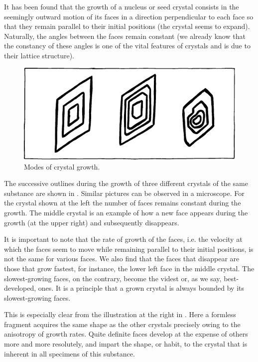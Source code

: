 It has been found that the growth of a nucleus or seed crystal consists in the seemingly outward motion of its faces in a direction perpendicular to each face so that they remain parallel to their initial positions (the crys­tal seems to expand). Naturally, the angles between the faces remain constant (we already know that the con­stancy of these angles is one of the vital features of crys­tals and is due to their lattice structure).
\begin{figure}[!ht]
\centering
\includegraphics[width=\textwidth]{figures/fig-04-06.pdf}
\caption{Modes of crystal growth.}
\label{fig-4.6}
\end{figure}
The successive outlines during the growth of three differ­ent crystals of the same substance are shown in . Similar pictures can be observed in a microscope. For the crystal shown at the left the number of faces remains constant during the growth. The middle crystal is an example of how a new face appears during the growth (at the upper right) and subsequently disappears.

It is important to note that the rate of growth of the faces, i.e. the velocity at which the faces seem to move while remaining parallel to their initial positions, is not the same for various faces. We also find that the faces that disappear are those that grow fastest, for instance, the lower left face in the middle crystal. The slowest-growing faces, on the contrary, become the videst or, as we say, best-developed, ones. It is a principle that a grown crystal is always bounded by its slowest-growing faces.

This is especially clear from the illustration at the right in . Here a formless fragment acquires the same shape as the other crystals precisely owing to the anisotropy of growth rates. Quite definite faces devel­op at the expense of others more and more resolutely, and impart the shape, or habit, to the crystal that is inherent in all specimens of this substance.

